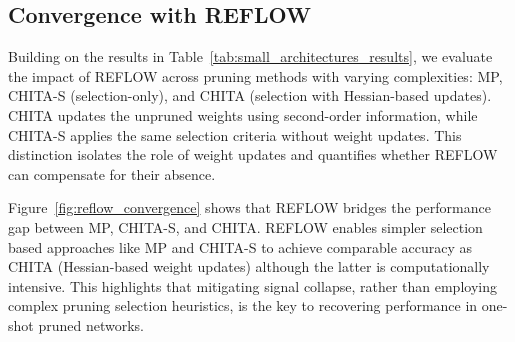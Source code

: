 \subsection{Convergence with REFLOW}
Building on the results in Table~\ref{tab:small_architectures_results}, we evaluate the impact of REFLOW across pruning methods with varying complexities: MP, CHITA-S (selection-only), and CHITA (selection with Hessian-based updates). CHITA updates the unpruned weights using second-order information, while CHITA-S applies the same selection criteria without weight updates. This distinction isolates the role of weight updates and quantifies whether REFLOW can compensate for their absence.

Figure~\ref{fig:reflow_convergence} shows that REFLOW bridges the performance gap between MP, CHITA-S, and CHITA. REFLOW enables simpler selection based approaches like MP and CHITA-S to achieve comparable accuracy as CHITA (Hessian-based weight updates) although the latter is computationally intensive. This highlights that mitigating signal collapse, rather than employing complex pruning selection heuristics, is the key to recovering performance in one-shot pruned networks.




